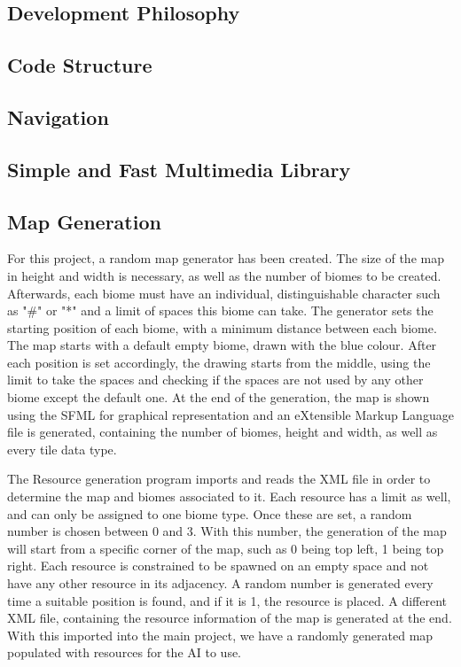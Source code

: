 \documentclass[a4paper]{report}
\begin{document}
\subsection{Development Philosophy}
\subsection{Code Structure}
\subsection{Navigation}
\subsection{Simple and Fast Multimedia Library}
\subsection{Map Generation}
For this project, a random map generator has been created. The size of the map in height and width is necessary, as well as the number of biomes to be created. Afterwards, each biome must have an individual, distinguishable character such as "\#" or "*" and a limit of spaces this biome can take. The generator sets the starting position of each biome, with a minimum distance between each biome. The map starts with a default empty biome, drawn with the blue colour. After each position is set accordingly, the drawing starts from the middle, using the limit to take the spaces and checking if the spaces are not used by any other biome except the default one.	At the end of the generation, the map is shown using the SFML for graphical representation and an eXtensible Markup Language file is generated, containing the number of biomes, height and width, as well as every tile data type.

The Resource generation program imports and reads the XML file in order to determine the map and biomes associated to it. Each resource has a limit as well, and can only be assigned to one biome type. Once these are set, a random number is chosen between 0 and 3. With this number, the generation of the map will start from a specific corner of the map, such as 0 being top left, 1 being top right. Each resource is constrained to be spawned on an empty space and not have any other resource in its adjacency. A random number is generated every time a suitable position is found, and if it is 1, the resource is placed. A different XML file, containing the resource information of the map is generated at the end. With this imported into the main project, we have a randomly generated map populated with resources for the AI to use.
\end{document}
